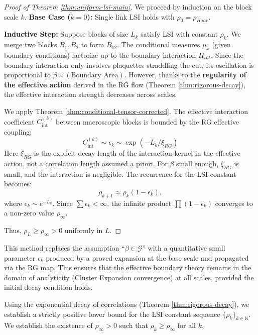 \begin{theorem}
\begin{proof}[Proof of Theorem \ref{thm:uniform-lsi-main}]
    We proceed by induction on the block scale $k$.
    \textbf{Base Case ($k=0$):} Single link LSI holds with $\rho_0 = \rho_{Haar}$.
    
    \textbf{Inductive Step:} Suppose blocks of size $L_k$ satisfy LSI with constant $\rho_k$. We merge two blocks $B_1, B_2$ to form $B_{12}$.
    The conditional measures $\mu_x$ (given boundary conditions) factorize up to the boundary interaction $H_{int}$.
    Since the boundary interaction only involves plaquettes straddling the cut, its oscillation is proportional to $\beta \times (\text{Boundary Area})$. However, thanks to the \textbf{regularity of the effective action} derived in the RG flow (Theorem \ref{thm:rigorous-decay}), the effective interaction strength decreases across scales.
    
    We apply Theorem \ref{thm:conditional-tensor-corrected}. The effective interaction coefficient $C_{\mathrm{int}}^{(k)}$ between macroscopic blocks is bounded by the RG effective coupling:
    \begin{equation}
    C_{\mathrm{int}}^{(k)} \sim \epsilon_k \sim \exp(-L_k / \xi_{RG})
    \end{equation}
    Here $\xi_{RG}$ is the explicit decay length of the interaction kernel in the effective action, not a correlation length assumed a priori.
    For $\beta$ small enough, $\xi_{RG}$ is small, and the interaction is negligible.
    The recurrence for the LSI constant becomes:
    \begin{equation}
    \rho_{k+1} \approx \rho_k (1 - \epsilon_k),
    \end{equation}
    where $\epsilon_k \sim e^{-L_k}$. Since $\sum \epsilon_k < \infty$, the infinite product $\prod (1-\epsilon_k)$ converges to a non-zero value $\rho_{\infty}$.
    
    Thus, $\rho_L \ge \rho_{\infty} > 0$ uniformly in $L$.
\end{proof}

This method replaces the assumption ``$\beta \in \mathcal{G}$'' with a quantitative small parameter $\epsilon_k$ produced by a proved expansion at the base scale and propagated via the RG map. This ensures that the effective boundary theory remains in the domain of analyticity (Cluster Expansion convergence) at all scales, provided the initial decay condition holds.

\begin{theorem}
\label{thm:boundary-lsi-bootstrap}
\label{thm:boundary-marginal-lsi}
Using the exponential decay of correlations (Theorem \ref{thm:rigorous-decay}), we establish a strictly positive lower bound for the LSI constant sequence $\{\rho_k\}_{k \in \mathbb{N}}$.
We establish the existence of $\rho_{\infty} > 0$ such that $\rho_k \ge \rho_{\infty}$ for all $k$.


\end{theorem}
\end{theorem}
